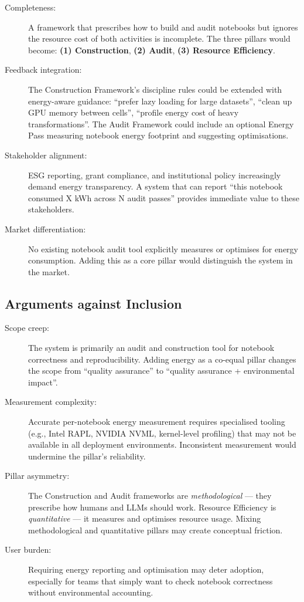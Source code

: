 \documentclass[11pt, a4paper]{article}
\begin{document}
\begin{description}
  \item[Completeness:] A framework that prescribes how to build and audit
    notebooks but ignores the resource cost of both activities is incomplete.
    The three pillars would become: \textbf{(1) Construction}, \textbf{(2)
    Audit}, \textbf{(3) Resource Efficiency}.

  \item[Feedback integration:] The Construction Framework's discipline rules
    could be extended with energy-aware guidance: ``prefer lazy loading for
    large datasets'', ``clean up GPU memory between cells'', ``profile energy
    cost of heavy transformations''. The Audit Framework could include an
    optional Energy Pass measuring notebook energy footprint and suggesting
    optimisations.

  \item[Stakeholder alignment:] ESG reporting, grant compliance, and
    institutional policy increasingly demand energy transparency. A system
    that can report ``this notebook consumed X kWh across N audit passes''
    provides immediate value to these stakeholders.

  \item[Market differentiation:] No existing notebook audit tool explicitly
    measures or optimises for energy consumption. Adding this as a core pillar
    would distinguish the system in the market.
\end{description}

\subsection*{Arguments against Inclusion}

\begin{description}
  \item[Scope creep:] The system is primarily an audit and construction tool
    for notebook correctness and reproducibility. Adding energy as a co-equal
    pillar changes the scope from ``quality assurance'' to ``quality
    assurance + environmental impact''.

  \item[Measurement complexity:] Accurate per-notebook energy measurement
    requires specialised tooling (e.g., Intel RAPL, NVIDIA NVML, kernel-level
    profiling) that may not be available in all deployment environments.
    Inconsistent measurement would undermine the pillar's reliability.

  \item[Pillar asymmetry:] The Construction and Audit frameworks are
    \textit{methodological} — they prescribe how humans and LLMs should work.
    Resource Efficiency is \textit{quantitative} — it measures and optimises
    resource usage. Mixing methodological and quantitative pillars may create
    conceptual friction.

  \item[User burden:] Requiring energy reporting and optimisation may deter
    adoption, especially for teams that simply want to check notebook
    correctness without environmental accounting.
\end{description}
\end{document}

